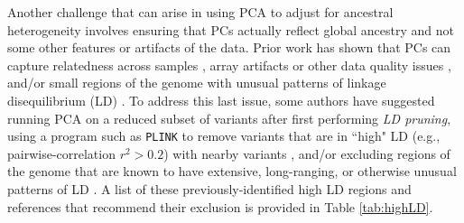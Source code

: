 \documentclass[12pt]{article}
\newcommand{\add}[1]{{\color{red}{[... #1 ...]}}}
\begin{document}
Another challenge that can arise in using PCA to adjust for ancestral heterogeneity involves ensuring that PCs actually reflect global ancestry and not some other features or artifacts of the data. 
Prior work has shown that PCs can capture relatedness across samples \citep{patterson2006, price2010, abdellaoui2013, conomos2015}, array artifacts or other data quality issues \citep{patterson2006, eigenstrat, price2010, weale2010}, and/or small regions of the genome with unusual patterns of linkage disequilibrium (LD) \citep{patterson2006, eigenstrat, wellcome2007, tian2008, price2008, price2010, weale2010, zou2010, laurie2010, abdellaoui2013, prive2020}. 
To address this last issue, some authors have suggested running PCA on a reduced subset of variants after first performing \textit{LD pruning}, using a program such as \texttt{PLINK} \citep{plink} to remove variants that are in ``high" LD (e.g., pairwise-correlation $r^2 > 0.2$) with nearby variants  \citep{wellcome2007, fellay2007, novembre2008, yu2008, nelson2008, anderson2010, weale2010, laurie2010, abdellaoui2013, zhang2013, conomos2015, reed2015, galinsky2016, conomos2016, daya2019}, and/or excluding regions of the genome that are known to have extensive, long-ranging, or otherwise unusual patterns of LD \citep{wellcome2007,  fellay2007, novembre2008, price2008, anderson2010, weale2010, raska2012, conomos2016}. 
A list of these previously-identified high LD regions and references that recommend their exclusion is provided in Table \ref{tab:highLD}.
\end{document}
